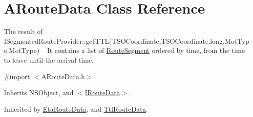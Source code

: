 \hypertarget{interface_a_route_data}{}\section{A\+Route\+Data Class Reference}
\label{interface_a_route_data}


The result of I\+Segmented\+Route\+Provider\+::get\+T\+T\+L(\+T\+S\+O\+Coordinate,\+T\+S\+O\+Coordinate,long,\+Mot\+Type,\+Mot\+Type) ~\newline
 It contains a list of \hyperlink{interface_route_segment}{Route\+Segment} ordered by time, from the time to leave until the arrival time.  




{\ttfamily \#import $<$A\+Route\+Data.\+h$>$}



Inherits N\+S\+Object, and \hyperlink{protocol_i_route_data-p}{$<$\+I\+Route\+Data$>$}.



Inherited by \hyperlink{interface_eta_route_data}{Eta\+Route\+Data}, and \hyperlink{interface_ttl_route_data}{Ttl\+Route\+Data}.

